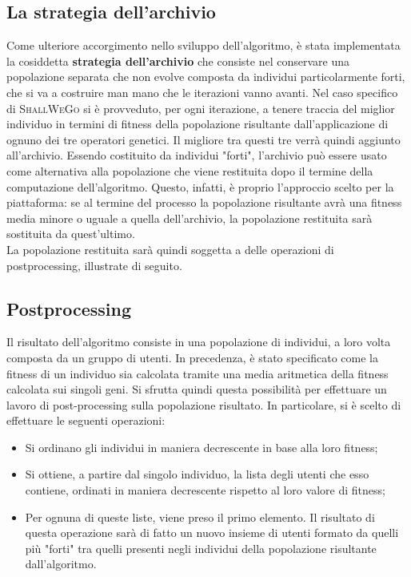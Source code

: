         \subsection{La strategia dell'archivio}
            Come ulteriore accorgimento nello sviluppo dell'algoritmo, è stata implementata la cosiddetta \textbf{strategia dell'archivio} che consiste nel conservare una popolazione separata che non evolve composta da individui particolarmente forti, che si va a costruire man mano che le iterazioni vanno avanti. Nel caso specifico di \textsc{ShallWeGo} si è provveduto, per ogni iterazione, a tenere traccia del miglior individuo in termini di fitness della popolazione risultante dall'applicazione di ognuno dei tre operatori genetici. Il migliore tra questi tre verrà quindi aggiunto all'archivio.
            Essendo costituito da individui "forti", l'archivio può essere usato come alternativa alla popolazione che viene restituita dopo il termine della computazione dell'algoritmo. Questo, infatti, è proprio l'approccio scelto per la piattaforma: se al termine del processo la popolazione risultante avrà una fitness media minore o uguale a quella dell'archivio, la popolazione restituita sarà sostituita da quest'ultimo. \\
            La popolazione restituita sarà quindi soggetta a delle operazioni di postprocessing, illustrate di seguito.

        \subsection{Postprocessing}
            Il risultato dell'algoritmo consiste in una popolazione di individui, a loro volta composta da un gruppo di utenti. In precedenza, è stato specificato come la fitness di un individuo sia calcolata tramite una media aritmetica della fitness calcolata sui singoli geni. Si sfrutta quindi questa possibilità per effettuare un lavoro di post-processing sulla popolazione risultato. In particolare, si è scelto di effettuare le seguenti operazioni:

            \begin{itemize}
                \item Si ordinano gli individui in maniera decrescente in base alla loro fitness;
                \item Si ottiene, a partire dal singolo individuo, la lista degli utenti che esso contiene, ordinati in maniera decrescente rispetto al loro valore di fitness;
                \item Per ognuna di queste liste, viene preso il primo elemento. Il risultato di questa operazione sarà di fatto un nuovo insieme di utenti formato da quelli più "forti" tra quelli presenti negli individui della popolazione risultante dall'algoritmo.
            \end{itemize}

